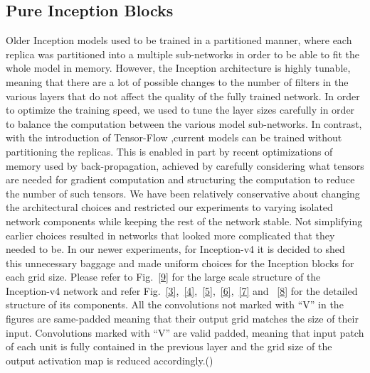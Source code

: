 \documentclass[a4paper,12pt, twoside]{NITKReport}
\begin{document}
\subsection{Pure Inception Blocks}
Older Inception models used to be trained in a partitioned manner, where each replica was partitioned into a multiple sub-networks in order to be able to fit the whole model in memory.  However, the Inception architecture is highly  tunable,  meaning  that  there  are  a  lot  of  possible changes to the number of filters in the various layers that do  not  affect  the  quality  of  the  fully  trained  network. In order to optimize the training speed,  we used to tune the layer sizes carefully in order to balance the computation between the various model sub-networks. In contrast, with the introduction of Tensor-Flow ,current models can be trained without partitioning the replicas. This is enabled in part by recent optimizations of memory used by back-propagation, achieved by carefully considering what tensors are needed for gradient computation and structuring the computation to reduce the number of such tensors. We have been relatively conservative about changing the architectural choices and restricted our experiments to varying isolated network components while keeping the rest of the network stable.  Not simplifying earlier choices resulted in networks that looked more complicated that they needed to be. In our newer experiments, for Inception-v4 it is decided to shed this unnecessary baggage and made uniform choices for the Inception blocks for each grid size.  Please refer to Fig.~\ref{9} for the large scale structure of the Inception-v4 network and refer Fig.~\ref{3},~\ref{4},~\ref{5},~\ref{6},~\ref{7} and ~\ref{8} for the detailed structure  of  its  components. All the convolutions not  marked with “V” in the figures are same-padded meaning that their output grid matches the size of their input. Convolutions marked with “V” are valid padded, meaning that input patch of each unit is fully contained in the previous layer and the grid  size  of  the  output  activation  map  is  reduced  accordingly.(\cite{DBLP:journals/corr/SzegedyIV16})
\end{document}
